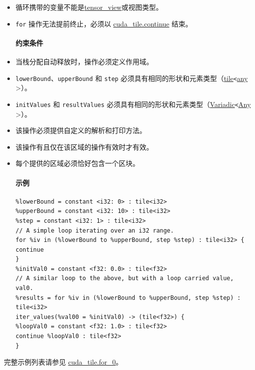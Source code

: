 \documentclass{article}
\begin{document}
\begin{itemize}
\item 循环携带的变量不能是\href{https://docs.nvidia.com/cuda/tile-ir/latest/sections/types.html#type-tensor-view}{tensor\_view}或视图类型。
\item \texttt{for} 操作无法提前终止，必须以 \href{https://docs.nvidia.com/cuda/tile-ir/latest/sections/operations.html#op-cuda-tile-continue}{cuda\_tile.continue} 结束。


\paragraph{约束条件}

\item 当栈分配自动释放时，操作必须定义作用域。
\item \texttt{lowerBound}、\texttt{upperBound} 和 \texttt{step} 必须具有相同的形状和元素类型（\href{https://docs.nvidia.com/cuda/tile-ir/latest/sections/types.html#type-tile}{tile}\texttt{<}\href{https://docs.nvidia.com/cuda/tile-ir/latest/sections/operations.html#type-any}{any} >）。
\item \texttt{initValues} 和 \texttt{resultValues} 必须具有相同的形状和元素类型（\href{https://docs.nvidia.com/cuda/tile-ir/latest/sections/operations.html#type-variadic}{Variadic}\texttt{<}\href{https://docs.nvidia.com/cuda/tile-ir/latest/sections/operations.html#type-any}{Any} >）。
\item 该操作必须提供自定义的解析和打印方法。
\item 该操作有且仅在该区域的操作有效时才有效。
\item 每个提供的区域必须恰好包含一个区块。


\paragraph{示例}

\begin{lstlisting}
%lowerBound = constant <i32: 0> : tile<i32>
%upperBound = constant <i32: 10> : tile<i32>
%step = constant <i32: 1> : tile<i32>
// A simple loop iterating over an i32 range.
for %iv in (%lowerBound to %upperBound, step %step) : tile<i32> {
continue
}
%initVal0 = constant <f32: 0.0> : tile<f32>
// A similar loop to the above, but with a loop carried value, val0.
%results = for %iv in (%lowerBound to %upperBound, step %step) : tile<i32>
iter_values(%val00 = %initVal0) -> (tile<f32>) {
%loopVal0 = constant <f32: 1.0> : tile<f32>
continue %loopVal0 : tile<f32>
}
\end{lstlisting}

\end{itemize}
完整示例列表请参见 \href{https://docs.nvidia.com/cuda/tile-ir/latest/sections/appendix.html#example-cuda-tile-for-0}{cuda\_tile.for\_0}。
\end{document}
